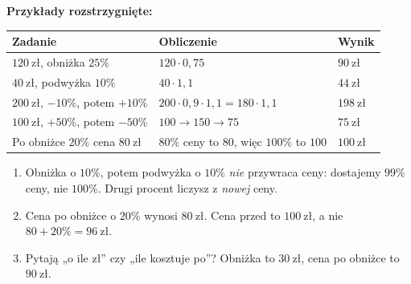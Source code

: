 \documentclass[11pt,a4paper]{article}
\begin{document}
\vspace{0.2em}
\textbf{Przykłady rozstrzygnięte:}
\begin{center}
\renewcommand{\arraystretch}{1.5}
\begin{tabular}{@{}lll@{}}
\toprule
Zadanie & Obliczenie & Wynik \\
\midrule
$120\ \text{zł}$, obniżka $25\%$ & $120\cdot 0{,}75$ & $90\ \text{zł}$ \\
$40\ \text{zł}$, podwyżka $10\%$ & $40\cdot 1{,}1$ & $44\ \text{zł}$ \\
$200\ \text{zł}$, $-10\%$, potem $+10\%$ & $200\cdot 0{,}9\cdot 1{,}1=180\cdot 1{,}1$ & $198\ \text{zł}$ \\
$100\ \text{zł}$, $+50\%$, potem $-50\%$ & $100\to 150\to 75$ & $75\ \text{zł}$ \\
Po obniżce $20\%$ cena $80\ \text{zł}$ & $80\%$ ceny to $80$, więc $100\%$ to $100$ & $100\ \text{zł}$ \\
\bottomrule
\end{tabular}
\end{center}

\begin{pulapka}
\begin{enumerate}[leftmargin=*, itemsep=2pt]
  \item Obniżka o $10\%$, potem podwyżka o $10\%$ \emph{nie} przywraca ceny: dostajemy $99\%$ ceny, nie $100\%$. Drugi procent liczysz z \emph{nowej} ceny.
  \item Cena po obniżce o $20\%$ wynosi $80\ \text{zł}$. Cena przed to $100\ \text{zł}$, a nie $80+20\%=96\ \text{zł}$.
  \item Pytają „o ile zł” czy „ile kosztuje po”? Obniżka to $30\ \text{zł}$, cena po obniżce to $90\ \text{zł}$.
\end{enumerate}
\end{pulapka}
\end{document}

